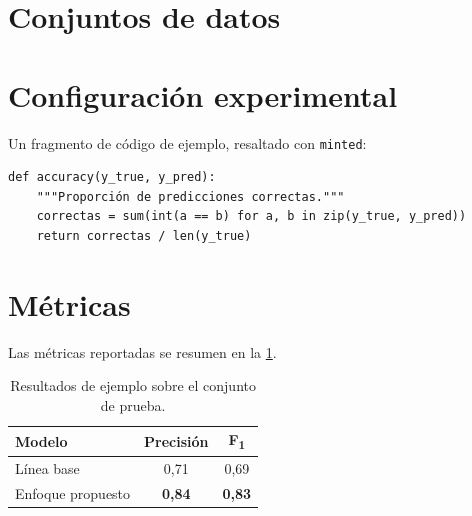 
\section{Conjuntos de datos}

\section{Configuración experimental}
Un fragmento de código de ejemplo, resaltado con \texttt{minted}:

\begin{verbatim}
def accuracy(y_true, y_pred):
    """Proporción de predicciones correctas."""
    correctas = sum(int(a == b) for a, b in zip(y_true, y_pred))
    return correctas / len(y_true)
\end{verbatim}

\section{Métricas}
Las métricas reportadas se resumen en la \cref{tab:metricas}.

\begin{table}[htbp]
  \centering
  \caption{Resultados de ejemplo sobre el conjunto de prueba.}
  \label{tab:metricas}
  \begin{tabular}{lcc}
    \toprule
    Modelo            & Precisión & F\textsubscript{1} \\
    \midrule
    Línea base        & 0,71      & 0,69 \\
    Enfoque propuesto & \textbf{0,84} & \textbf{0,83} \\
    \bottomrule
  \end{tabular}
\end{table}
